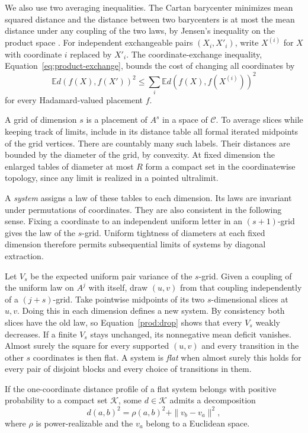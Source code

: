 We also use two averaging inequalities. The Cartan barycenter minimizes
mean squared distance and the distance between two barycenters is at most
the mean distance under any coupling of the two laws, by Jensen's
inequality on the product space \cite{Sturm}. For independent exchangeable
pairs $(X_i,X'_i)$, write $X^{(i)}$ for $X$ with coordinate $i$ replaced
by $X'_i$. The coordinate-exchange inequality, Equation~\eqref{eq:product-exchange},
bounds the cost of changing all coordinates by
\begin{equation}\label{prod:exchange}
 \mathbb E d(f(X),f(X'))^2
 \le\sum_i\mathbb E d(f(X),f(X^{(i)}))^2
\end{equation}
for every Hadamard-valued placement $f$.

A grid of dimension $s$ is a placement of $A^s$ in a space of
$\mathcal C$. To average slices while keeping track of limits, include
in its distance table all formal iterated midpoints of the grid vertices.
There are countably many such labels. Their distances are bounded by
the diameter of the grid, by convexity. At fixed dimension the enlarged
tables of diameter at most $R$ form a compact set in the coordinatewise
topology, since any limit is realized in a pointed ultralimit.

A \emph{system} assigns a law of these tables to each dimension. Its
laws are invariant under permutations of coordinates. They are also
consistent in the following sense. Fixing a coordinate to an independent
uniform letter in an $(s+1)$-grid gives the law of the $s$-grid.
Uniform tightness of diameters at each fixed dimension therefore permits
subsequential limits of systems by diagonal extraction.

Let $V_s$ be the expected uniform pair variance of the $s$-grid. Given
a coupling of the uniform law on $A^j$ with itself, draw $(u,v)$ from
that coupling independently of a $(j+s)$-grid. Take pointwise midpoints
of its two $s$-dimensional slices at $u,v$. Doing this in each dimension
defines a new system. By consistency both slices have the old law,
so Equation~\eqref{prod:drop} shows that every $V_s$ weakly decreases.
If a finite $V_s$ stays unchanged, its nonnegative mean deficit vanishes.
Almost surely the square for every supported $(u,v)$ and every transition
in the other $s$ coordinates is then flat. A system is \emph{flat} when
almost surely this holds for every pair of disjoint blocks and every
choice of transitions in them.

\begin{lemma}\label{prod:extract}
If the one-coordinate distance profile of a flat system belongs with positive
probability to a compact set $\mathcal K$, some $d\in\mathcal K$ admits
a decomposition
\[
 d(a,b)^2=\rho(a,b)^2+\|v_b-v_a\|^2 ,
\]
where $\rho$ is power-realizable and the $v_a$ belong to a Euclidean space.
\end{lemma}


